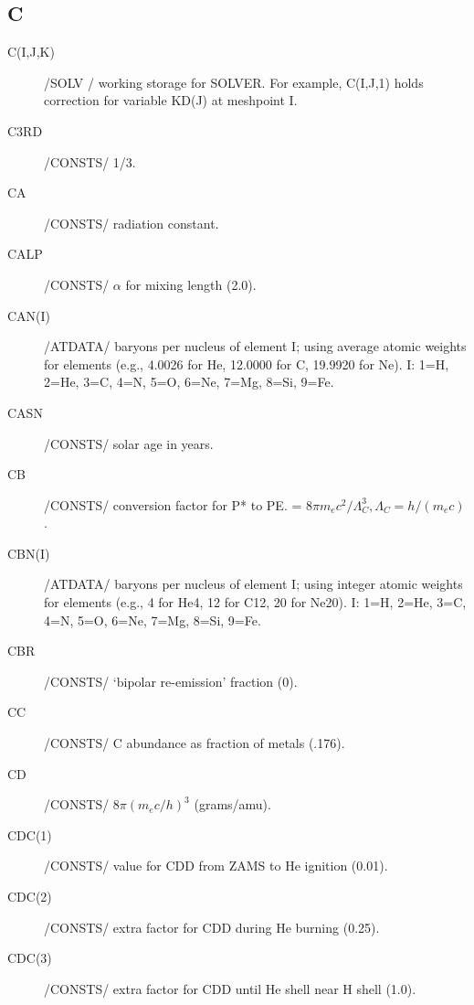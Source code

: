 \documentclass{article}
\begin{document}
\subsection*{C}
\begin{description}
    \item[C(I,J,K)]    /SOLV  / working storage for SOLVER.
                        For example, C(I,J,1) holds correction for variable KD(J) at meshpoint I.
    
	\item[C3RD]		/CONSTS/ 1/3.

	\item[CA]		    /CONSTS/ radiation constant.

	\item[CALP]		/CONSTS/ $\alpha$ for mixing length (2.0).

	\item[CAN(I)]     	/ATDATA/ baryons per nucleus of element I; using average atomic weights for elements
				    (e.g., 4.0026 for He, 12.0000 for C, 19.9920 for Ne).
				    I: 1=H, 2=He, 3=C, 4=N, 5=O, 6=Ne, 7=Mg, 8=Si, 9=Fe.

	\item[CASN]		/CONSTS/ solar age in years.

	\item[CB]		    /CONSTS/ conversion factor for P* to PE. = $8 \pi m_e c^2 / \Lambda_C^3, \Lambda_C=h/(m_e c)$.
	\item[CBN(I)]     	/ATDATA/ baryons per nucleus of element I; using integer atomic weights for elements
				    (e.g., 4 for He4, 12 for C12, 20 for Ne20).
				    I: 1=H, 2=He, 3=C, 4=N, 5=O, 6=Ne, 7=Mg, 8=Si, 9=Fe.

	\item[CBR]		    /CONSTS/ `bipolar re-emission' fraction (0).

	\item[CC]		    /CONSTS/ C abundance as fraction of metals (.176).

	\item[CD]		    /CONSTS/ $8 \pi (m_e c/h)^3$ (grams/amu).

	\item[CDC(1)]		/CONSTS/ value for CDD from ZAMS to He ignition (0.01).

	\item[CDC(2)]		/CONSTS/ extra factor for CDD during He burning (0.25).

	\item[CDC(3)]		/CONSTS/ extra factor for CDD until He shell near H shell (1.0).


\end{description}
\end{document}
